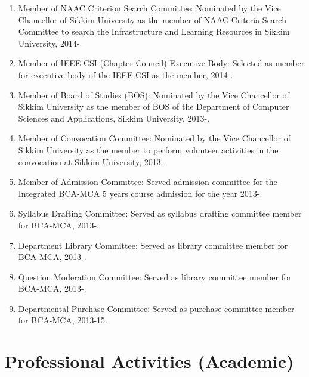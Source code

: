 \documentclass[11pt,a4paper]{moderncv}
\begin{document}
\begin{adjustwidth}{6em}{0pt}
\begin{enumerate}
		\item Member of NAAC Criterion Search Committee: Nominated by the Vice Chancellor of Sikkim University as the member of NAAC Criteria Search Committee to search the Infrastructure and Learning Resources in Sikkim University, 2014-.
		
		\item Member of IEEE CSI (Chapter Council) Executive Body: Selected as member for executive body of the IEEE CSI as the member, 2014-.
		
		\item Member of Board of Studies (BOS): Nominated by the Vice Chancellor of Sikkim University as the member of BOS of the Department of Computer Sciences and Applications, Sikkim University, 2013-.
		
		\item Member of Convocation Committee: Nominated by the Vice Chancellor of Sikkim University as the member to perform volunteer activities in the convocation at Sikkim University, 2013-.
		
		\item Member of Admission Committee: Served admission committee for the Integrated BCA-MCA 5 years course admission for the year 2013-.
		
		\item Syllabus Drafting Committee: Served as syllabus drafting committee member for BCA-MCA, 2013-.
		
		\item Department Library Committee: Served as library committee member for BCA-MCA, 2013-.
		
		\item Question Moderation Committee: Served as library committee member for BCA-MCA, 2013-.
		
		\item Departmental Purchase Committee: Served as purchase committee member for BCA-MCA, 2013-15.
		
	\end{enumerate}
\end{adjustwidth}


\section{\textbf{Professional Activities (Academic)}}
\end{document}
